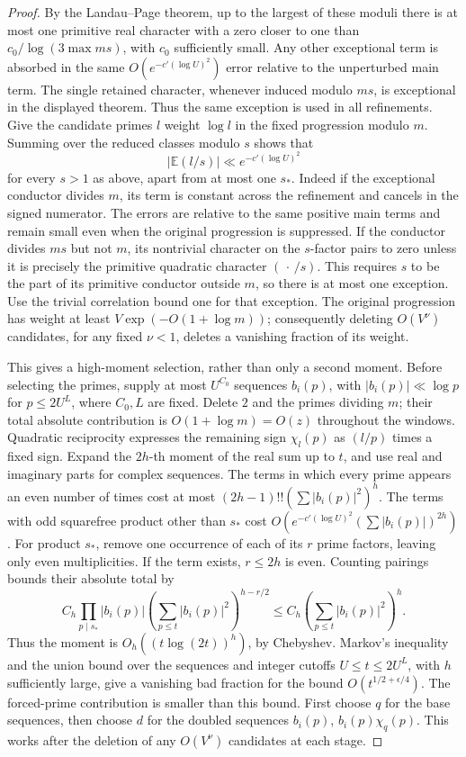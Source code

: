 \begin{proof}
By the Landau--Page theorem, up to the largest of these moduli there
is at most one primitive real character with a zero closer to one
than \(c_0/\log(3\max ms)\), with \(c_0\) sufficiently small.
Any other exceptional term is absorbed in the same
\(O(e^{-c'(\log U)^2})\) error relative to the unperturbed main term.
The single retained character, whenever induced modulo \(ms\), is
exceptional in the displayed theorem.  Thus the same exception is
used in all refinements. Give the candidate primes \(l\) weight
\(\log l\) in the fixed progression modulo \(m\).
Summing over the reduced classes modulo \(s\) shows that
\[
 \left|\mathbb E(l/s)\right|\ll e^{-c'(\log U)^2}
\]
for every \(s>1\) as above, apart from at most one \(s_*\).
Indeed if the exceptional conductor divides \(m\), its term is
constant across the refinement and cancels in the signed numerator.
The errors are relative to the same positive main terms and remain
small even when the original progression is suppressed. If the
conductor divides \(ms\) but not \(m\), its nontrivial character on
the \(s\)-factor pairs to zero unless it is precisely the primitive
quadratic character \((\,\cdot\,/s)\). This requires \(s\) to be the
part of its primitive conductor outside \(m\), so there is at most
one exception. Use the trivial correlation bound one for that
exception. The original progression has weight at least
\(V\exp(-O(1+\log m))\); consequently deleting \(O(V^\nu)\)
candidates, for any fixed \(\nu<1\), deletes a vanishing fraction
of its weight.

This gives a high-moment selection, rather than only a second moment.
Before selecting the primes, supply at most \(U^{C_0}\) sequences
\(b_i(p)\), with \(|b_i(p)|\ll\log p\) for \(p\le2U^L\),
where \(C_0,L\) are fixed. Delete \(2\) and the primes dividing
\(m\); their total absolute contribution is \(O(1+\log m)=O(z)\)
throughout the windows. Quadratic reciprocity expresses the remaining
sign \(\chi_l(p)\) as \((l/p)\) times a fixed sign. Expand the \(2h\)-th
moment of the real sum up to \(t\), and use real and imaginary parts
for complex sequences. The terms in which every prime appears an
even number of times cost at most
\((2h-1)!!(\sum |b_i(p)|^2)^h\). The terms with odd squarefree product
other than \(s_*\) cost \(O(e^{-c'(\log U)^2}(\sum|b_i(p)|)^{2h})\).
For product \(s_*\), remove one occurrence of each of its \(r\) prime
factors, leaving only even multiplicities. If the term exists,
\(r\le2h\) is even. Counting pairings bounds their absolute total by
\[
 C_h\prod_{p\mid s_*}|b_i(p)|
       \left(\sum_{p\le t}|b_i(p)|^2\right)^{h-r/2}
 \le C_h\left(\sum_{p\le t}|b_i(p)|^2\right)^h .
\]
Thus the moment is \(O_h((t\log(2t))^h)\), by Chebyshev.
Markov's inequality and the union bound over the sequences and
integer cutoffs \(U\le t\le2U^L\), with \(h\) sufficiently large,
give a vanishing bad fraction for the bound
\(O(t^{1/2+\epsilon/4})\).  The forced-prime contribution is smaller
than this bound. First choose \(q\) for the base sequences, then choose
\(d\) for the doubled sequences \(b_i(p)\), \(b_i(p)\chi_q(p)\).
This works after the deletion of any \(O(V^\nu)\) candidates at
each stage.


\end{proof}
